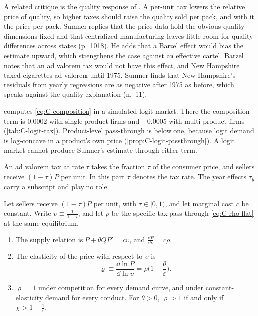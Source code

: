 A related critique is the quality response of \citet{Barzel1976}. A per-unit tax lowers the relative price of
quality, so higher taxes should raise the quality sold per pack, and with it the price per pack. Sumner replies that
the price data hold the obvious quality dimensions fixed and that centralized manufacturing leaves little room for
quality differences across states (p.~1018). He adds that a Barzel effect would bias the estimate upward, which
strengthens the case against an effective cartel. Barzel notes that an ad valorem tax would not have this effect, and
New Hampshire taxed cigarettes ad valorem until 1975. Sumner finds that New Hampshire's residuals from yearly
regressions are as negative after 1975 as before, which speaks against the quality explanation (n.~11).

 computes \eqref{eq:C-composition} in a simulated logit market. There the composition term
is 0.0002 with single-product firms and $-0.0005$ with multi-product firms (\cref{tab:C-logit-tax}). Product-level
pass-through is below one, because logit demand is log-concave in a product's own price
(\cref{prop:C-logit-passthrough}). A logit market cannot produce Sumner's estimate through either term.

An ad valorem tax at rate $\tau$ takes the fraction $\tau$ of the consumer price, and sellers receive $(1 - \tau)P$
per unit. In this part $\tau$ denotes the tax rate. The year effects $\tau_y$ carry a subscript and play no role.

\begin{proposition}\label{prop:C-adval}
Let sellers receive $(1 - \tau)P$ per unit, with $\tau \in [0, 1)$, and let marginal cost $c$ be constant. Write
$\upsilon \equiv \frac{1}{1 - \tau}$, and let $\rho$ be the specific-tax pass-through \eqref{eq:C-rho-flat} at the same
equilibrium.
\begin{enumerate}[label=(\roman*)]
\item The supply relation is $P + \theta QP' = c\upsilon$, and $\frac{\dd P}{\dd\upsilon} = c\rho$.
\item The elasticity of the price with respect to $\upsilon$ is
  \begin{equation}\label{eq:C-adval-elast}
  \varrho \equiv \frac{\dd\ln P}{\dd\ln\upsilon} = \rho\Big(1 - \frac{\theta}{\varepsilon}\Big) .
  \end{equation}
\item $\varrho = 1$ under competition for every demand curve, and under constant-elasticity demand for every conduct.
  For $\theta > 0$, $\varrho > 1$ if and only if $\chi > 1 + \frac{1}{\varepsilon}$.
\end{enumerate}
\end{proposition}

